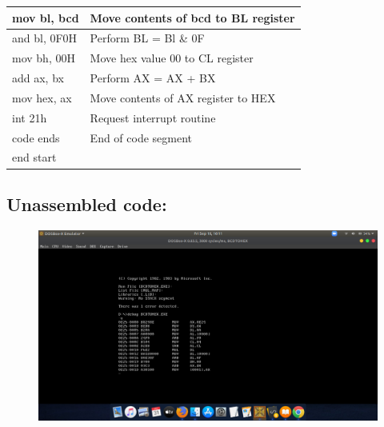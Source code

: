 \documentclass[12pt,a4paper]{article}
\begin{document}
\begin{flushleft}
\begin{table}[htb]
{\begin{tabular}{|l|l|}
\hline
mov bl, bcd                                                      & Move contents of bcd to BL register           \\
\hline
and bl, 0F0H                                                     & Perform BL = Bl \& 0F                         \\
\hline
mov bh, 00H                                                      & Move hex value 00 to CL register              \\
\hline
add ax, bx                                                       & Perform AX = AX + BX                          \\
\hline
mov hex, ax                                                      & Move contents of AX register to HEX           \\
\hline
int 21h                                                          & Request interrupt routine                     \\ 
\hline
code ends                                                        & End of code segment                           \\
\hline
end start                                                        &                                               \\
\hline
\end{tabular}
}
\end{table}

\newpage
\subsection*{\textbf{Unassembled code:}}
\begin{figure}[h]
    \centering
    \includegraphics[trim = 100mm 60mm 200mm 120mm, clip, width = \textwidth]{Pics/BHUS.png}
\end{figure}

\end{flushleft}
\end{document}
